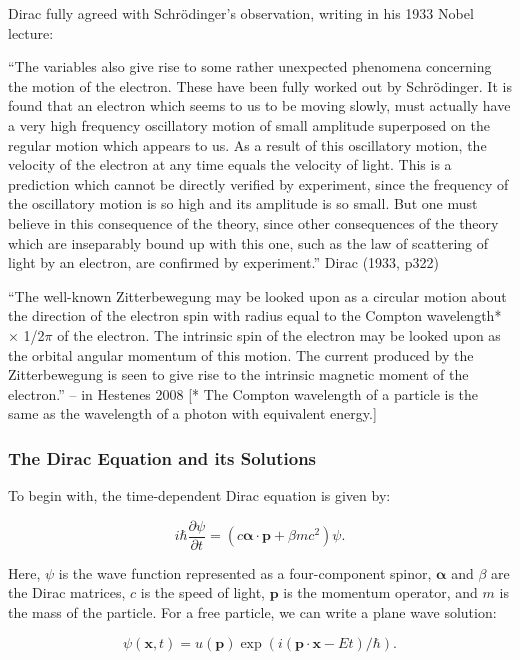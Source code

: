 \documentclass[%
 reprint,
 amsmath,amssymb,
 aps,
]{revtex4-1}
\numberwithin{equation}{section}%
\begin{document}
Dirac fully agreed with Schrödinger’s observation, writing in his 1933 Nobel lecture:

“The variables also give rise to some rather unexpected phenomena concerning the motion of the electron. These have been fully worked out by Schrödinger. It is found that an electron which seems to us to be moving slowly, must actually have a very high frequency oscillatory motion of small amplitude superposed on the regular motion which appears to us. As a result of this oscillatory motion, the velocity of the electron at any time equals the velocity of light. This is a prediction which cannot be directly verified by experiment, since the frequency of the oscillatory motion is so high and its amplitude is so small. But one must believe in this consequence of the theory, since other consequences of the theory which are inseparably bound up with this one, such as the law of scattering of light by an electron, are confirmed by experiment.” Dirac (1933, p322)

“The well-known Zitterbewegung may be looked upon as a circular motion about the direction of the electron spin with radius equal to the Compton wavelength* × 1/2$\pi$ of the electron. The intrinsic spin of the electron may be looked upon as the orbital angular momentum of this motion. The current produced by the Zitterbewegung is seen to give rise to the intrinsic magnetic moment of the electron.” – in Hestenes 2008
[* The Compton wavelength of a particle is the same as the wavelength of a photon with equivalent energy.]


\subsubsection{\label{sec:The Dirac Equation}The Dirac Equation and its Solutions}

To begin with, the time-dependent Dirac equation is given by:

\begin{equation}
    i\hbar\frac{\partial\psi}{\partial t} = (c\boldsymbol{\alpha}\cdot\mathbf{p} + \beta mc^2)\psi .
\end{equation}

Here, $\psi$ is the wave function represented as a four-component spinor, $\boldsymbol{\alpha}$ and $\beta$ are the Dirac matrices, $c$ is the speed of light, $\mathbf{p}$ is the momentum operator, and $m$ is the mass of the particle. For a free particle, we can write a plane wave solution:

\begin{equation}
    \psi(\mathbf{x},t) = u(\mathbf{p}) \exp\left(i(\mathbf{p}\cdot\mathbf{x} - Et)/\hbar\right).
\end{equation}
\end{document}
